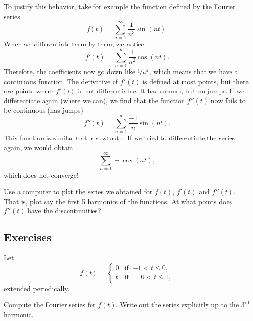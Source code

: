 To justify this behavior, take for example the function defined by
the Fourier series
\begin{equation*}
f(t) = \sum_{n=1}^\infty \frac{1}{n^3} \sin (n t) .
\end{equation*}
When we differentiate term by term, we notice
\begin{equation*}
f'(t) = \sum_{n=1}^\infty \frac{1}{n^2} \cos (n t) .
\end{equation*}
Therefore, the coefficients now go down like $\nicefrac{1}{n^2}$, which 
means that we have a continuous function.
The derivative 
of $f'(t)$ is defined
at most points, but there are points where $f'(t)$ is not differentiable.
It has corners, but no jumps.
If we
differentiate again (where we can), we find that the function
$f''(t)$
now fails to be continuous (has jumps)
\begin{equation*}
f''(t) = \sum_{n=1}^\infty \frac{-1}{n} \sin (n t) .
\end{equation*}
This function is similar to the sawtooth.  If we tried to differentiate
the series again, we would obtain
\begin{equation*}
\sum_{n=1}^\infty -\cos (n t) ,
\end{equation*}
which does not converge!

\begin{exercise}
Use a computer to plot the series we obtained for $f(t)$, $f'(t)$ and
$f''(t)$.  That is, plot say the first 5 harmonics of the functions.  At what
points does $f''(t)$ have the discontinuities?
\end{exercise}

\subsection{Exercises}

\begin{exercise}
Let
\begin{equation*}
f(t) =
\begin{cases}
0 & \text{if } \; {-1} < t \leq 0 , \\
t & \text{if } \; \phantom{-}0 < t \leq  1 ,
\end{cases}
\end{equation*}
extended periodically.
\begin{tasks}
\task Compute the Fourier series for $f(t)$.
\task Write out the series explicitly up to the $3^{\text{rd}}$ harmonic.
\end{tasks}
\end{exercise}

